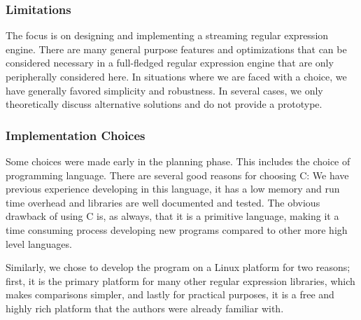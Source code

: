 \subsubsection{Limitations}

The focus is on designing and implementing a streaming regular
expression engine. There are many general purpose features and
optimizations that can be considered necessary in a full-fledged
regular expression engine that are only peripherally considered
here. In situations where we are faced with a choice, we have
generally favored simplicity and robustness.  In several cases, we
only theoretically discuss alternative solutions and do not provide a
prototype.%

\subsubsection{Implementation Choices}

Some choices were made early in the planning phase. This includes the
choice of programming language. There are several good reasons for
choosing C: We have previous experience developing in this language,
it has a low memory and run time overhead and libraries are well
documented and tested. The obvious drawback of using C is, as always,
that it is a primitive language, making it a time consuming process
developing new programs compared to other more high level languages.

Similarly, we chose to develop the program on a Linux platform for two
reasons; first, it is the primary platform for many other regular
expression libraries, which makes comparisons simpler, and lastly for
practical purposes, it is a free and highly rich platform that the
authors were already familiar with.



